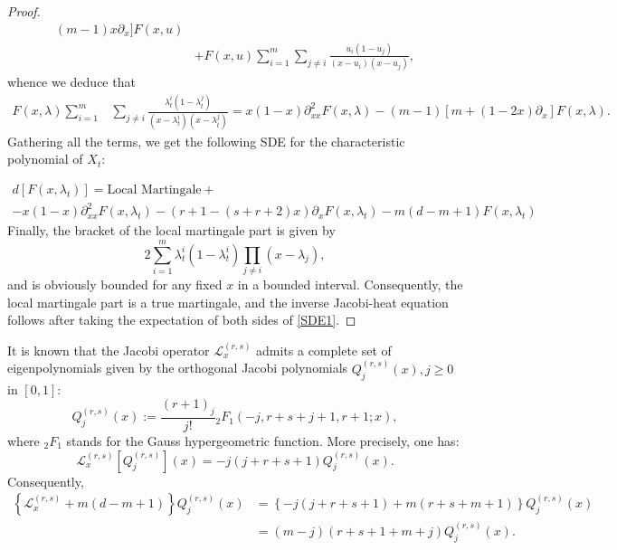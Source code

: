 \documentclass[12pt,reqno]{amsart}
\begin{document}
\begin{proof}
\begin{align*}
		(m-1)x\partial_x]F(x, u)                                          \\& + F(x, u) \sum_{i=1}^m\sum_{j \neq i} \frac{u_i(1-u_j)}{(x-u_i)(x-u_j)},
	\end{align*}
	whence we deduce that
	\begin{align*}
		F(x, \lambda)  \sum_{i=1}^m & \sum_{j\neq i}\frac{\lambda_t^i(1-\lambda_t^j)}{(x-\lambda_t^i)(x-\lambda_t^j)} = x(1-x)\partial_{xx}^2F(x, \lambda)                                                                                                                        -(m-1)[m+(1-2x)\partial_x]F(x, \lambda).
	\end{align*}
	Gathering all the terms, we get the following SDE for the characteristic polynomial of $X_t$:

	\begin{multline}\label{SDE1}
		d[F(x,\lambda_t)]= \textrm{Local Martingale} +\\
		-x(1-x)\partial_{xx}^2F(x,\lambda_t) - (r+1-(s+r+2)x)\partial_x F(x,\lambda_t)
		- m(d-m+1)F(x,\lambda_t) %
	\end{multline}
	Finally, the bracket of the local martingale part is given by
	\begin{equation*}
		2\sum_{i=1}^m \lambda_t^i(1-\lambda_t^i)\prod_{j \neq i}(x-\lambda_j),
	\end{equation*}
	and is obviously bounded for any fixed $x$ in a bounded interval. Consequently, the local martingale part is a true martingale, and the inverse Jacobi-heat equation follows after taking the expectation of both sides of \eqref{SDE1}.
\end{proof}

It is known that the Jacobi operator $\mathcal{L}_x^{(r,s)}$ admits a complete set of eigenpolynomials given by the orthogonal Jacobi polynomials $Q_j^{(r,s)}(x), j \geq 0$ in $[0,1]$:
\begin{equation*}
	Q_j^{(r,s)}(x) := \frac{(r+1)_j}{j!}{}_2F_1(-j, r+s+j+1, r+1; x),
\end{equation*}
where ${}_2F_1$ stands for the Gauss hypergeometric function. More precisely, one has:
\begin{equation*}
	\mathcal{L}_x^{(r,s)}[Q_j^{(r,s)}](x)= -j(j+r+s+1)Q_j^{(r,s)}(x).
\end{equation*}
Consequently,
\begin{align*}
	\left\{\mathcal{L}_x^{(r,s)} + m(d-m+1)\right\}Q_j^{(r,s)}(x) & =
	\left\{-j(j+r+s+1) + m(r+s+m+1)\right\}Q_j^{(r,s)}(x)
	\\& = (m-j)(r+s+1+m+j)Q_j^{(r,s)}(x).
\end{align*}
\end{document}
